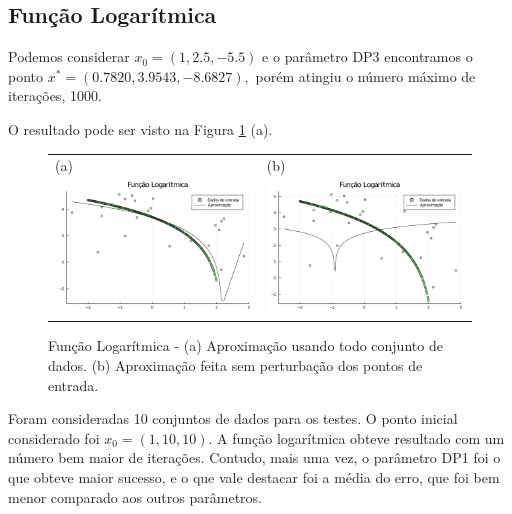 \documentclass[12pt,a4paper]{article}
\begin{document}
	\subsection{Função Logarítmica} \label{log}
		Podemos considerar $x_0=(1, 2.5, -5.5)$ e o parâmetro DP3 encontramos o ponto $x^*=(0.7820, 3.9543, -8.6827),$ porém atingiu o número máximo de iterações, 1000.
		
		O resultado pode ser visto na Figura \ref{fig3} (a).
	
	\begin{figure}[H]
		\centering 
		\begin{tabular}{ll}
			
			(a)& (b)   \\
			
			\includegraphics[width=0.45\linewidth]{5.png} & \includegraphics[width=0.45\linewidth]{6.png}\\ 
			
		\end{tabular}
		\caption{Função Logarítmica - (a) Aproximação usando todo conjunto de dados. (b) Aproximação feita sem perturbação dos pontos de entrada.}
		\label{fig3}
	\end{figure}
	
	
	Foram consideradas 10 conjuntos de dados para os testes. O ponto inicial considerado foi $x_0 = (1, 10, 10).$ A função logarítmica obteve resultado com um número bem maior de iterações. Contudo, mais uma vez, o parâmetro DP1 foi o que obteve maior sucesso, e o que vale destacar foi a média do erro, que foi bem menor comparado aos outros parâmetros.
	
\end{document}
